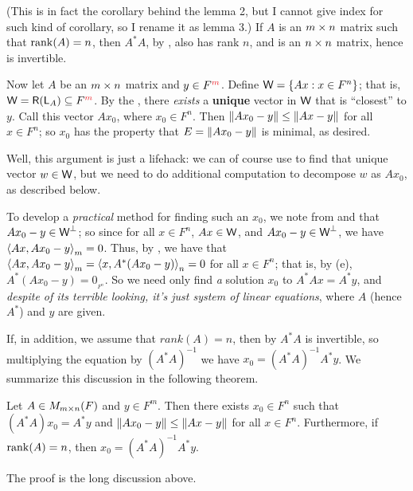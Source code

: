 \begin{lemma} \label{lem 6.3}
(This is in fact the corollary behind the lemma 2, but I cannot give index for such kind of corollary, so I rename it as lemma 3.)
If \(A\) is an \(m \times n\) matrix such that \(\mathrm{rank}(A) = n\), then \(A^* A\), by , also has rank \(n\), and is an \(n \times n\) matrix, hence is invertible.
\end{lemma}

Now let \(A\) be an \(m \times n\) matrix and \(y \in F^{\RED{m}}\).
Define \(\textsf{W} = \{ Ax : x \in F^n \}\); that is, \(\W = \RANGE(\LMTRAN_A) \subseteq F^{\RED{m}}\).
By the , there \emph{exists} a \textbf{unique} vector in \(\textsf{W}\) that is ``closest'' to \(y\).
Call this vector \(Ax_0\), where \(x_0 \in F^n\).
Then \(\left\lVert Ax_0 - y\right\rVert \le \left\lVert Ax - y\right\rVert\) for all \(x \in F^n\); so \(x_0\) has the property that \(E = \left\lVert Ax_0 - y\right\rVert\) is minimal, as desired.

\begin{remark} \label{remark 6.3.7}
Well, this argument is just a lifehack: we can of course use  to find that unique vector \(w \in \textsf{W}\), but we need to do additional computation to decompose \(w\) as \(A x_0\), as described below.
\end{remark}

To develop a \emph{practical} method for finding such an \(x_0\), we note from  and  that \textbf{\(A x_0 - y \in \textsf{W}^{\perp}\)};
so since for all \(x \in F^n\), \(Ax \in \textsf{W}\), and \(A x_0 - y \in \textsf{W}^{\perp}\), we have \(\left< Ax, A x_0 - y \right>_m = 0\).
Thus, by , we have that \(\left< Ax, A x_0 - y \right>_m = \left< x, A^*(Ax_0 - y) \right>_n = 0\) for all \(x \in F^n\);
that is, by (e), \(A^*(Ax_0 - y) = 0_{_{F^n}}\).
So we need only find \emph{a} solution \(x_0\) to \(A^* Ax = A^*y\), and \emph{despite of its terrible looking, it's just system of linear equations}, where \(A\) (hence \(A^*\)) and \(y\) are given.

If, in addition, we assume that \(rank(A) = n\), then by  \(A^* A\) is invertible, so multiplying the equation by \((A^* A)^{-1}\) we have \(x_0 = (A^* A)^{-1} A^*y\).
We summarize this discussion in the following theorem.

\begin{theorem} \label{thm 6.12}
Let \(A \in M_{m \times n}(F)\) and \(y \in F^m\).
Then there exists \(x_0 \in F^n\) such that \((A^* A)x_0 = A^*y\) and \(\left\lVert A x_0 - y\right\rVert \le \left\lVert Ax - y\right\rVert\) for all \(x \in F^n\).
Furthermore, if \(\mathrm{rank}(A) = n\), then \(x_0 = (A^* A)^{-1} A^* y\).

The proof is the long discussion above.
\end{theorem}

